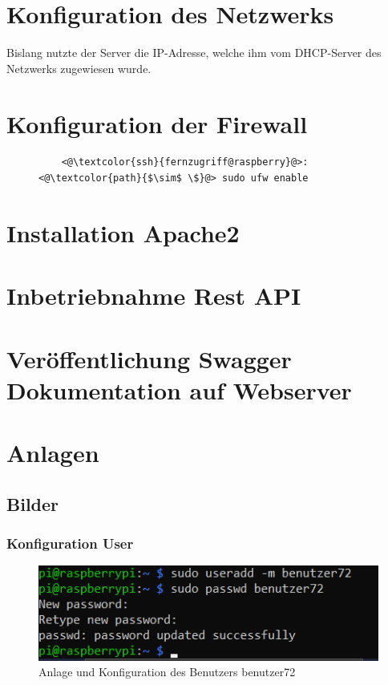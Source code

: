 \documentclass[a4paper, 11pt]{scrartcl}
\begin{document}
\section{Konfiguration des Netzwerks}
Bislang nutzte der Server die IP-Adresse, welche ihm vom DHCP-Server des Netzwerks zugewiesen wurde.



\section{Konfiguration der Firewall}

\begin{figure}[H]
    \begin{lstlisting}
    <@\textcolor{ssh}{fernzugriff@raspberry}@>: <@\textcolor{path}{$\sim$ \$}@> sudo ufw enable
    \end{lstlisting}
\end{figure}



\section{Installation Apache2}



\section{Inbetriebnahme Rest API}



\section{Veröffentlichung Swagger Dokumentation auf Webserver}



\newpage
\section{Anlagen}
\subsection{Bilder}\label{ch:pics}

\subsubsection{Konfiguration User}\label{ch:pic_user}
\begin{figure}[H]
    \begin{center}
        \includegraphics[scale=1]{Bilder/useradd_benutzer72.png}
        \caption{Anlage und Konfiguration des Benutzers \glqq benutzer72\grqq}\label{pic:useradd_72}
    \end{center}
\end{figure}
\end{document}

